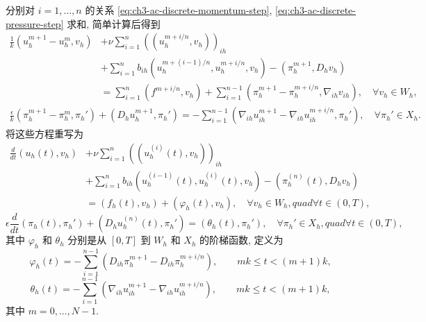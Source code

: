 \hypertarget{chapter-03-page-322}{}
\begin{Proof}
分别对 $i=1,\ldots,n$ 的关系 \eqref{eq:ch3-ac-discrete-momentum-step}, \eqref{eq:ch3-ac-discrete-pressure-step} 求和, 简单计算后得到
\begin{equation}
\begin{aligned}
\frac1k(u_h^{m+1}-u_h^m,v_h)
&+\nu\sum_{i=1}^n((u_h^{m+i/n},v_h))_{ih}\\
&+\sum_{i=1}^n b_{ih}(u_h^{m+(i-1)/n},u_h^{m+i/n},v_h)
-(\pi_h^{m+1},D_hv_h)\\
&=\sum_{i=1}^n(f^{m+i/n},v_h)
+\sum_{i=1}^{n-1}(\pi_h^{m+1}-\pi_h^{m+i/n},\nabla_{ih}v_{ih}),
\quad\forall v_h\in W_h,
\end{aligned}
\label{eq:ch3-ac-discrete-summed-momentum}
\end{equation}
\begin{equation}
\begin{aligned}
\frac\epsilon k(\pi_h^{m+1}-\pi_h^m,\pi_h')
+(D_hu_h^{m+1},\pi_h')
=-\sum_{i=1}^{n-1}
(\nabla_{ih}u_{ih}^{m+1}-\nabla_{ih}u_{ih}^{m+i/n},\pi_h'),
\quad\forall\pi_h'\in X_h.
\end{aligned}
\label{eq:ch3-ac-discrete-summed-pressure}
\end{equation}
将这些方程重写为
\begin{equation}
\begin{aligned}
\frac d{dt}(u_h(t),v_h)
&+\nu\sum_{i=1}^n((u_h^{(i)}(t),v_h))_{ih}\\
&+\sum_{i=1}^n b_{ih}(u_h^{(i-1)}(t),u_h^{(i)}(t),v_h)
-(\pi_h^{(n)}(t),D_hv_h)\\
&=(f_h(t),v_h)+(\varphi_h(t),v_h),
\quad\forall v_h\in W_h,quad\forall t\in(0,T),
\end{aligned}
\label{eq:ch3-ac-discrete-time-momentum}
\end{equation}
\begin{equation}
\epsilon\frac d{dt}(\pi_h(t),\pi_h')
+(D_hu_h^{(n)}(t),\pi_h')
=(\theta_h(t),\pi_h'),
\quad\forall\pi_h'\in X_h,quad\forall t\in(0,T),
\label{eq:ch3-ac-discrete-time-pressure}
\end{equation}
其中 $\varphi_h$ 和 $\theta_h$ 分别是从 $[0,T]$ 到 $W_h$ 和 $X_h$ 的阶梯函数, 定义为
\begin{equation}
\varphi_h(t)=-\sum_{i=1}^{n-1}
(D_{ih}\pi_h^{m+1}-D_{ih}\pi_h^{m+i/n}),
\qquad mk\leq t<(m+1)k,
\label{eq:ch3-ac-discrete-pressure-remainder}
\end{equation}
\begin{equation}
\theta_h(t)=-\sum_{i=1}^{n-1}
(\nabla_{ih}u_{ih}^{m+1}-\nabla_{ih}u_{ih}^{m+i/n}),
\qquad mk\leq t<(m+1)k,
\label{eq:ch3-ac-discrete-divergence-remainder}
\end{equation}
其中 $m=0,\ldots,N-1$.


\end{Proof}
